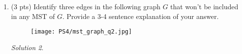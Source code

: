 \documentclass[12pt]{article}
\theoremstyle{remark}
\newtheorem*{solution}{Solution}
\begin{document}
\begin{enumerate}
\begin{solution}
\end{solution}

\item (3 pts) Identify three edges in the following graph $G$ that won't be included in any MST of $G$. Provide a 3-4 sentence explanation of your answer.  
\begin{figure}[h!]
\begin{center}
\texttt{[image: PS4/mst\_graph\_q2.jpg]} 
\end{center}
\end{figure}
\begin{solution}

\end{solution}


\end{enumerate}
\end{document}
